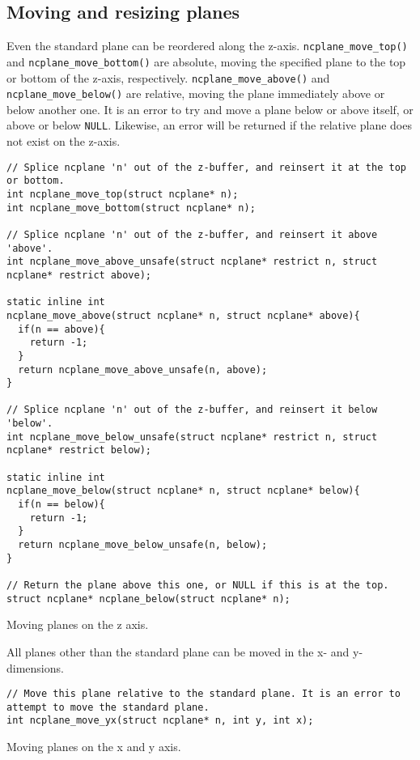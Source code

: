 \subsection{Moving and resizing planes}
Even the standard plane can be reordered along the z-axis. \texttt{ncplane\_move\_top()}
and \texttt{ncplane\_move\_bottom()} are absolute, moving the specified plane
to the top or bottom of the z-axis, respectively. \texttt{ncplane\_move\_above()}
and \texttt{ncplane\_move\_below()} are relative, moving the plane immediately
above or below another one. It is an error to try and move a plane below or above itself,
or above or below \texttt{NULL}. Likewise, an error will be returned if the relative
plane does not exist on the z-axis.
\begin{listing}[!htb]
\begin{verbatim}
// Splice ncplane 'n' out of the z-buffer, and reinsert it at the top or bottom.
int ncplane_move_top(struct ncplane* n);
int ncplane_move_bottom(struct ncplane* n);

// Splice ncplane 'n' out of the z-buffer, and reinsert it above 'above'.
int ncplane_move_above_unsafe(struct ncplane* restrict n, struct ncplane* restrict above);

static inline int
ncplane_move_above(struct ncplane* n, struct ncplane* above){
  if(n == above){
    return -1;
  }
  return ncplane_move_above_unsafe(n, above);
}

// Splice ncplane 'n' out of the z-buffer, and reinsert it below 'below'.
int ncplane_move_below_unsafe(struct ncplane* restrict n, struct ncplane* restrict below);

static inline int
ncplane_move_below(struct ncplane* n, struct ncplane* below){
  if(n == below){
    return -1;
  }
  return ncplane_move_below_unsafe(n, below);
}

// Return the plane above this one, or NULL if this is at the top.
struct ncplane* ncplane_below(struct ncplane* n);
\end{verbatim}
\caption{Moving planes on the z axis.}
\end{listing}

All planes other than the standard plane can be moved in the x- and y-dimensions.
\begin{listing}[!htb]
\begin{verbatim}
// Move this plane relative to the standard plane. It is an error to attempt to move the standard plane.
int ncplane_move_yx(struct ncplane* n, int y, int x);
\end{verbatim}
\caption{Moving planes on the x and y axis.}
\end{listing}

